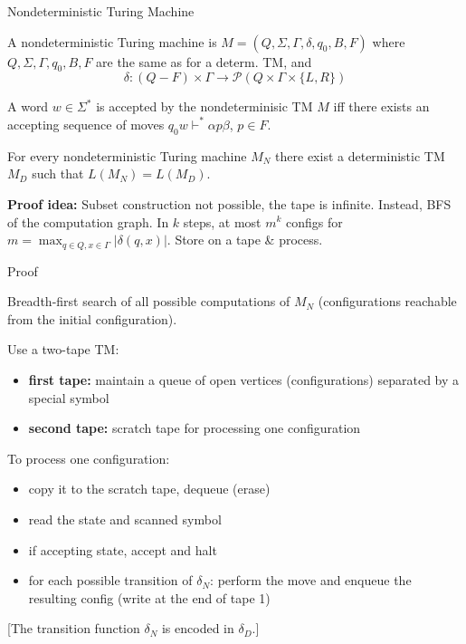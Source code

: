 \documentclass[handout]{beamer}
\begin{document}
\begin{frame}{Nondeterministic Turing Machine}

    \begin{definition}
        A \alert{nondeterministic Turing machine} is $M=(Q,\Sigma, \Gamma, \delta,q_0,B,F)$ where $Q,\Sigma,\Gamma,q_0,B,F$ are the same as for a determ. TM, and
        \vspace{-3pt}
        $$
        \delta: (Q- F)\times \Gamma\rightarrow \mathcal P(Q\times\Gamma\times\{L,R\})
        $$
        \vspace{-18pt}
        
        A word $w\in \Sigma^*$ \alert{is accepted} by the nondeterminisic TM $M$ iff there exists an accepting sequence of moves $q_0w\vdash^* \alpha p \beta$, $p\in F$.
    \end{definition} 
    
    \begin{theorem}
        For every nondeterministic Turing machine $M_N$ there exist a deterministic TM $M_D$ such that $L(M_N)=L(M_D)$.
    \end{theorem}

    \textbf{Proof idea:} Subset construction not possible, the tape is infinite. Instead, BFS of the computation graph. In $k$ steps, at most $m^k$ configs for $m=\max_{q\in Q,x\in\Gamma} |\delta(q,x) |$. Store on a tape \& process.

\end{frame}


\begin{frame}{Proof}

    Breadth-first search of all possible computations of $M_N$ (configurations reachable from the initial configuration).

    Use a two-tape TM:
    \begin{itemize}
        \item \textbf{first tape:} maintain a queue of open vertices (configurations) separated by a special symbol
        \item \textbf{second tape:} scratch tape for processing one configuration
    \end{itemize}

    To process one configuration: 
	\begin{itemize}
        \item copy it to the scratch tape, dequeue (erase)
        \item read the state and scanned symbol
		\item if accepting state, accept and halt
		\item for each possible transition of $\delta_N$: perform the move and enqueue the resulting config (write at the end of tape 1)
	\end{itemize}
    \vspace{-6pt}
    [The transition function $\delta_N$ is encoded in $\delta_D$.]

\end{frame}
\end{document}

